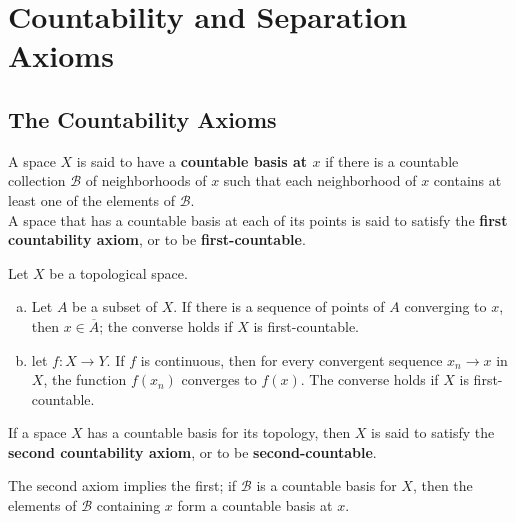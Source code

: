 \newpage

\section{Countability and Separation Axioms}
\setcounter{subsection}{29}

\subsection{The Countability Axioms}

\begin{definition}
A space $X$ is said to have a \textbf{countable basis at $x$} if there is a countable collection $\mathscr{B}$ of neighborhoods of $x$ such
that each neighborhood of $x$ contains at least one of the elements of $\mathscr{B}$. \\

A space that has a countable basis at each of its points is said to satisfy the \textbf{first countability axiom}, or to be \textbf{first-countable}.
\end{definition}

\begin{theorem}
Let $X$ be a topological space. 
\begin{enumerate}[a)]
    \item Let $A$ be a subset of $X$. If there is a sequence of points of $A$ converging to $x$, then $x \in \overline{A}$; 
    the converse holds if $X$ is first-countable.
    \item let $f\colon X \rightarrow Y$. If $f$ is continuous, then for every convergent sequence $x_n \rightarrow x$ in $X$, the function
    $f(x_n)$ converges to $f(x)$. The converse holds if $X$ is first-countable.
\end{enumerate}
\end{theorem}

\begin{definition}
If a space $X$ has a countable basis for its topology, then $X$ is said to satisfy the \textbf{second countability axiom}, or to be
\textbf{second-countable}.
\end{definition}

\begin{remark}
The second axiom implies the first; if $\mathscr{B}$ is a countable basis for $X$, then the elements of $\mathscr{B}$ containing $x$
form a countable basis at $x$.
\end{remark}

